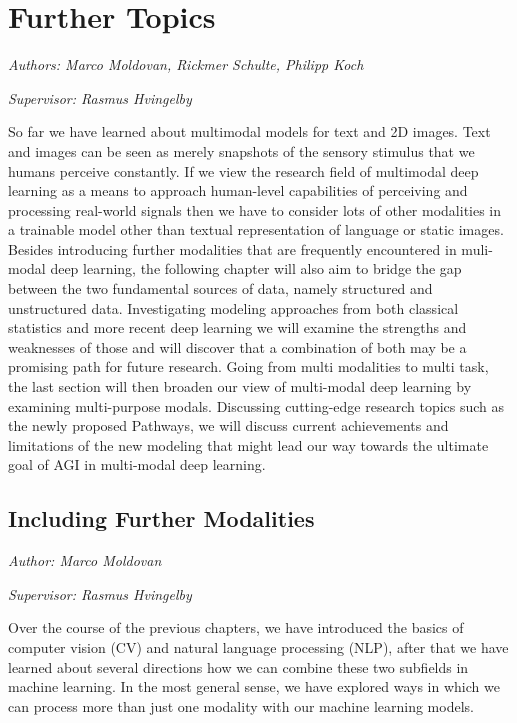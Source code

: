 \documentclass[
]{krantz}
\begin{document}
\hypertarget{c03-00-further}{%
\chapter{Further Topics}\label{c03-00-further}}

\emph{Authors: Marco Moldovan, Rickmer Schulte, Philipp Koch}

\emph{Supervisor: Rasmus Hvingelby}

So far we have learned about multimodal models for text and 2D images. Text and images can be seen as merely snapshots of the sensory stimulus that we humans perceive constantly. If we view the research field of multimodal deep learning as a means to approach human-level capabilities of perceiving and processing real-world signals then we have to consider lots of other modalities in a trainable model other than textual representation of language or static images. Besides introducing further modalities that are frequently encountered in muli-modal deep learning, the following chapter will also aim to bridge the gap between the two fundamental sources of data, namely structured and unstructured data. Investigating modeling approaches from both classical statistics and more recent deep learning we will examine the strengths and weaknesses of those and will discover that a combination of both may be a promising path for future research. Going from multi modalities to multi task, the last section will then broaden our view of multi-modal deep learning by examining multi-purpose modals. Discussing cutting-edge research topics such as the newly proposed Pathways, we will discuss current achievements and limitations of the new modeling that might lead our way towards the ultimate goal of AGI in multi-modal deep learning.

\hypertarget{c03-01-further-modalities}{%
\section{Including Further Modalities}\label{c03-01-further-modalities}}

\emph{Author: Marco Moldovan}

\emph{Supervisor: Rasmus Hvingelby}

Over the course of the previous chapters, we have introduced the basics of computer vision (CV) and natural language processing (NLP), after that we have learned about several directions how we can combine these two subfields in machine learning. In the most general sense, we have explored ways in which we can process more than just one modality with our machine learning models.
\end{document}
